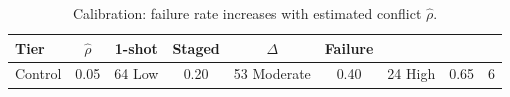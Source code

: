 \begin{table}[t]
\centering
\small
\begin{tabular}{lccccc}
\toprule
Tier & $\hat{\rho}$ & 1-shot & Staged & $\Delta$ & Failure \\
\midrule
Control & 0.05 & 64%
Low & 0.20 & 53%
Moderate & 0.40 & 24%
High & 0.65 & 6%
\bottomrule
\end{tabular}
\caption{Calibration: failure rate increases with estimated conflict $\hat{\rho}$.}
\label{tab:calibration}
\end{table}
